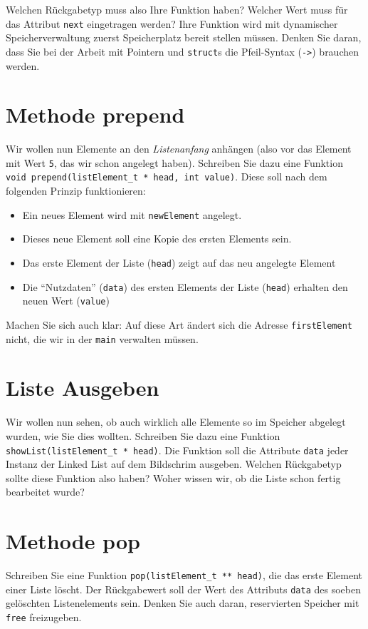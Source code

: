 \documentclass[
	ngerman,
	fontsize=10pt,
	parskip=half,
	titlepage=true,
	DIV=12
]{scrartcl}
\newcommand*{\inC}[1]{\texttt{#1}}
\begin{document}
Welchen Rückgabetyp muss also Ihre Funktion haben? Welcher Wert muss für das Attribut \texttt{next} eingetragen werden? Ihre Funktion wird mit dynamischer Speicherverwaltung zuerst Speicherplatz bereit stellen müssen. Denken Sie daran, dass Sie bei der Arbeit mit Pointern und \inC{struct}s die Pfeil-Syntax (\texttt{->}) brauchen werden.

\section{Methode prepend}
Wir wollen nun Elemente an den \emph{Listenanfang} anhängen (also vor das Element mit Wert \inC{5}, das wir schon angelegt haben). Schreiben Sie dazu eine Funktion \inC{void prepend(listElement_t * head, int value)}. Diese soll nach dem folgenden Prinzip funktionieren:

\begin{itemize}
\item Ein neues Element wird mit \texttt{newElement} angelegt.
\item Dieses neue Element soll eine Kopie des ersten Elements sein.
\item Das erste Element der Liste (\texttt{head}) zeigt auf das neu angelegte Element
\item Die \enquote{Nutzdaten} (\texttt{data}) des ersten Elements der Liste (\texttt{head}) erhalten den neuen Wert (\texttt{value})
\end{itemize}

Machen Sie sich auch klar: Auf diese Art ändert sich die Adresse \texttt{firstElement} nicht, die wir in der \texttt{main} verwalten müssen.

\section{Liste Ausgeben}
Wir wollen nun sehen, ob auch wirklich alle Elemente so im Speicher abgelegt wurden, wie Sie dies wollten. Schreiben Sie dazu eine Funktion \inC{showList(listElement_t * head)}. Die Funktion soll die Attribute \texttt{data} jeder Instanz der Linked List auf dem Bildschrim ausgeben. Welchen Rückgabetyp sollte diese Funktion also haben? Woher wissen wir, ob die Liste schon fertig bearbeitet wurde?

\section{Methode pop}
Schreiben Sie eine Funktion \inC{pop(listElement_t ** head)}, die das erste Element einer Liste löscht. Der Rückgabewert soll der Wert des Attributs \texttt{data} des soeben gelöschten Listenelements sein. Denken Sie auch daran, reservierten Speicher mit \texttt{free} freizugeben.
\end{document}

